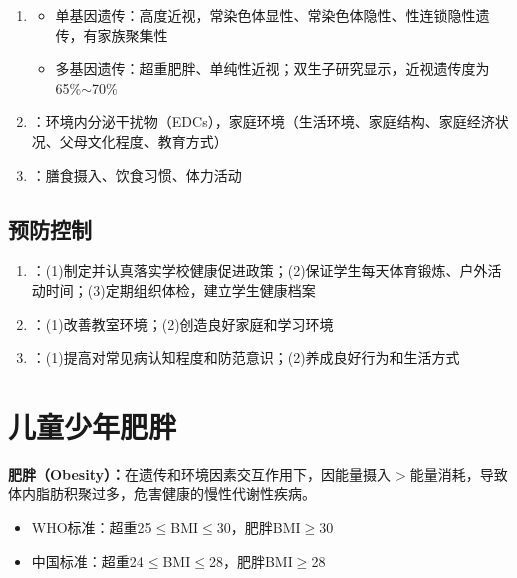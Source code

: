 \begin{keybox}
\begin{enumerate}[leftmargin=*]
    \item {}
    \begin{itemize}[leftmargin=*]
        \item 单基因遗传：高度近视，常染色体显性、常染色体隐性、性连锁隐性遗传，有家族聚集性
        \item 多基因遗传：超重肥胖、单纯性近视；双生子研究显示，近视遗传度为65\%$\sim$70\%
    \end{itemize}
    \item {}：环境内分泌干扰物（EDCs），家庭环境（生活环境、家庭结构、家庭经济状况、父母文化程度、教育方式）
    \item {}：膳食摄入、饮食习惯、体力活动
\end{enumerate}
\end{keybox}

\subsection{预防控制}

\begin{keybox}
\begin{enumerate}[leftmargin=*]
    \item {}：(1)制定并认真落实学校健康促进政策；(2)保证学生每天体育锻炼、户外活动时间；(3)定期组织体检，建立学生健康档案
    \item {}：(1)改善教室环境；(2)创造良好家庭和学习环境
    \item {}：(1)提高对常见病认知程度和防范意识；(2)养成良好行为和生活方式
\end{enumerate}
\end{keybox}

\section{儿童少年肥胖}

\begin{defbox}
\textbf{肥胖（Obesity）：}在遗传和环境因素交互作用下，因能量摄入$>$能量消耗，导致体内脂肪积聚过多，危害健康的慢性代谢性疾病。

\begin{itemize}[leftmargin=*]
    \item WHO标准：超重25$\leq$BMI$\leq$30，肥胖BMI$\geq$30
    \item 中国标准：超重24$\leq$BMI$\leq$28，肥胖BMI$\geq$28
\end{itemize}
\end{defbox}

